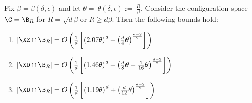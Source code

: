 \begin{cor}
    Fix $\beta=\beta\left(\delta,\epsilon\right)$ and let $\theta=~\theta\left(\delta,\epsilon\right):=~\frac{R}{\beta}$. Consider the configuration space  $\C=\B_R$ for $R=\sqrt{d}\beta$ or $R \geq d\beta$. Then the following bounds hold:
    \begin{enumerate}[topsep=1pt,itemsep=1ex,partopsep=1ex,parsep=1ex]
        \item 
            $|\XZ\cap\B_R| = O\left(\frac{1}{d}\left[\left(2.07\theta\right)^d+\left(\frac{d}{4}\theta\right)^\frac{d-2}{2}\right]\right)$
        \item 
            $|\XD\cap\B_R| = O\left(\frac{1}{d}\left[\left(1.46\theta\right)^d + \left(\frac{d}{8}\theta - \frac{1}{16}\theta\right)^\frac{d-2}{2}\right]\right)$
        \item 
        $|\XD\cap\B_R| = O\left(\frac{1}{d}\left[\left(1.19\theta\right)^d+\left(\frac{d}{12}\theta\right)^\frac{d-2}{2}\right]\right)$
    \end{enumerate}
\end{cor}
